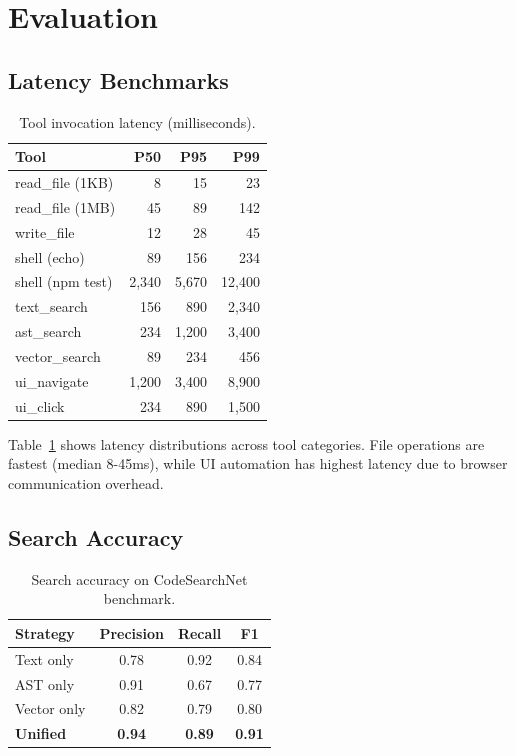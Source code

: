 \section{Evaluation}


\subsection{Latency Benchmarks}

\begin{table}[h]
\centering
\caption{Tool invocation latency (milliseconds).}
\label{tab:latency}
\begin{tabular}{lrrr}
\toprule
\textbf{Tool} & \textbf{P50} & \textbf{P95} & \textbf{P99} \\
\midrule
read\_file (1KB) & 8 & 15 & 23 \\
read\_file (1MB) & 45 & 89 & 142 \\
write\_file & 12 & 28 & 45 \\
shell (echo) & 89 & 156 & 234 \\
shell (npm test) & 2,340 & 5,670 & 12,400 \\
text\_search & 156 & 890 & 2,340 \\
ast\_search & 234 & 1,200 & 3,400 \\
vector\_search & 89 & 234 & 456 \\
ui\_navigate & 1,200 & 3,400 & 8,900 \\
ui\_click & 234 & 890 & 1,500 \\
\bottomrule
\end{tabular}
\end{table}

Table~\ref{tab:latency} shows latency distributions across tool categories. File operations are fastest (median 8-45ms), while UI automation has highest latency due to browser communication overhead.

\subsection{Search Accuracy}

\begin{table}[h]
\centering
\caption{Search accuracy on CodeSearchNet benchmark.}
\label{tab:search}
\begin{tabular}{lccc}
\toprule
\textbf{Strategy} & \textbf{Precision} & \textbf{Recall} & \textbf{F1} \\
\midrule
Text only & 0.78 & 0.92 & 0.84 \\
AST only & 0.91 & 0.67 & 0.77 \\
Vector only & 0.82 & 0.79 & 0.80 \\
\midrule
\textbf{Unified} & \textbf{0.94} & \textbf{0.89} & \textbf{0.91} \\
\bottomrule
\end{tabular}
\end{table}

